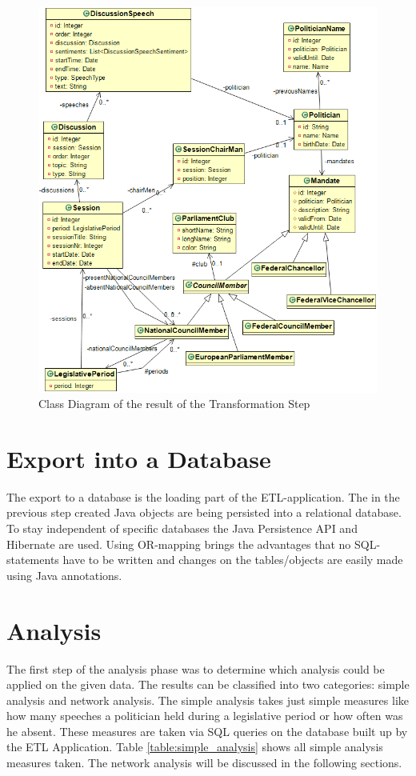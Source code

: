 \begin{figure}[h]
	\centering
	\includegraphics[width=\textwidth]{imgs/all_class_diagram}
	\caption{Class Diagram of the result of the Transformation Step}
	\label{fig:all_class_diagram}
\end{figure}


\section{Export into a Database}
\label{sec:export_db}
The export to a database is the loading part of the ETL-application. The in the previous step created Java objects are being persisted into a relational database. To stay independent of specific databases the Java Persistence API and Hibernate are used. Using OR-mapping brings the advantages that no SQL-statements have to be written and changes on the tables/objects are easily made using Java annotations.

\section{Analysis}
\label{sec:analysis}
The first step of the analysis phase was to determine which analysis could be applied on the given data. The results can be classified into two categories: simple analysis and network analysis. The simple analysis takes just simple measures like how many speeches a politician held during a legislative period or how often was he absent. These measures are taken via SQL queries on the database built up by the ETL Application. Table \ref{table:simple_analysis} shows all simple analysis measures taken. The network analysis will be discussed in the following sections.

